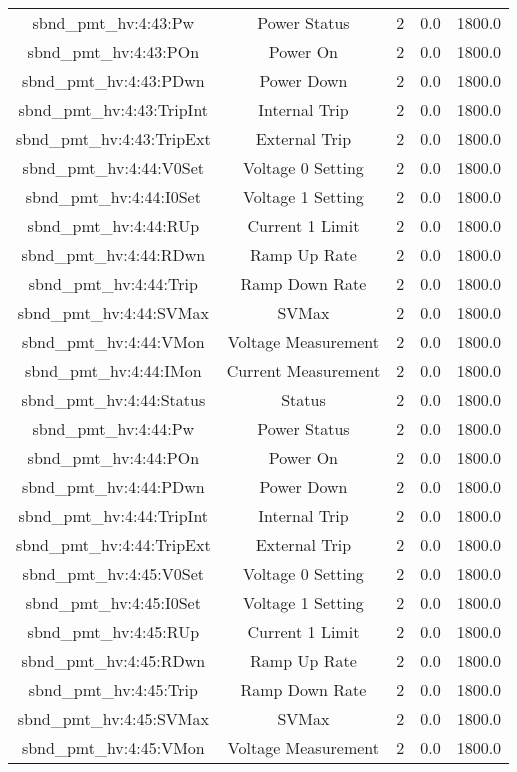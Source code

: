 \begin{table}[ptb]
\begin{tabular}{c | c c c c}
sbnd_pmt_hv:4:43:Pw & Power Status & 2 & 0.0 & 1800.0\\ 
sbnd_pmt_hv:4:43:POn & Power On & 2 & 0.0 & 1800.0\\ 
sbnd_pmt_hv:4:43:PDwn & Power Down & 2 & 0.0 & 1800.0\\ 
sbnd_pmt_hv:4:43:TripInt & Internal Trip & 2 & 0.0 & 1800.0\\ 
sbnd_pmt_hv:4:43:TripExt & External Trip & 2 & 0.0 & 1800.0\\ 
sbnd_pmt_hv:4:44:V0Set & Voltage 0 Setting & 2 & 0.0 & 1800.0\\ 
sbnd_pmt_hv:4:44:I0Set & Voltage 1 Setting & 2 & 0.0 & 1800.0\\ 
sbnd_pmt_hv:4:44:RUp & Current 1 Limit & 2 & 0.0 & 1800.0\\ 
sbnd_pmt_hv:4:44:RDwn & Ramp Up Rate & 2 & 0.0 & 1800.0\\ 
sbnd_pmt_hv:4:44:Trip & Ramp Down Rate & 2 & 0.0 & 1800.0\\ 
sbnd_pmt_hv:4:44:SVMax & SVMax & 2 & 0.0 & 1800.0\\ 
sbnd_pmt_hv:4:44:VMon & Voltage Measurement & 2 & 0.0 & 1800.0\\ 
sbnd_pmt_hv:4:44:IMon & Current Measurement & 2 & 0.0 & 1800.0\\ 
sbnd_pmt_hv:4:44:Status & Status & 2 & 0.0 & 1800.0\\ 
sbnd_pmt_hv:4:44:Pw & Power Status & 2 & 0.0 & 1800.0\\ 
sbnd_pmt_hv:4:44:POn & Power On & 2 & 0.0 & 1800.0\\ 
sbnd_pmt_hv:4:44:PDwn & Power Down & 2 & 0.0 & 1800.0\\ 
sbnd_pmt_hv:4:44:TripInt & Internal Trip & 2 & 0.0 & 1800.0\\ 
sbnd_pmt_hv:4:44:TripExt & External Trip & 2 & 0.0 & 1800.0\\ 
sbnd_pmt_hv:4:45:V0Set & Voltage 0 Setting & 2 & 0.0 & 1800.0\\ 
sbnd_pmt_hv:4:45:I0Set & Voltage 1 Setting & 2 & 0.0 & 1800.0\\ 
sbnd_pmt_hv:4:45:RUp & Current 1 Limit & 2 & 0.0 & 1800.0\\ 
sbnd_pmt_hv:4:45:RDwn & Ramp Up Rate & 2 & 0.0 & 1800.0\\ 
sbnd_pmt_hv:4:45:Trip & Ramp Down Rate & 2 & 0.0 & 1800.0\\ 
sbnd_pmt_hv:4:45:SVMax & SVMax & 2 & 0.0 & 1800.0\\ 
sbnd_pmt_hv:4:45:VMon & Voltage Measurement & 2 & 0.0 & 1800.0\\ 

\end{tabular}
\end{table}
